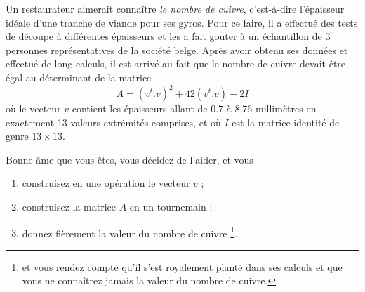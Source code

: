 \begin{exercice}\label{exoMatlab0028}

Un restaurateur aimerait connaître \emph{le nombre de cuivre}, c'est-à-dire l'épaisseur idéale d'une tranche de viande pour ses gyros. Pour ce faire, il a effectué des tests de découpe à différentes épaisseurs et les a fait gouter à un échantillon de 3 personnes représentatives de la société belge.
Après avoir obtenu ses données et effectué de long calculs, il est arrivé au fait que le nombre de cuivre devait être égal au déterminant de la matrice
\[ A= (v^t.v)^2 + 42(v^t.v) - 2I \]
où le vecteur $v$ contient les épaisseurs allant de $0.7$ à $8.76$ millimètres en exactement 13 valeurs extrémités comprises, et où
$I$ est la matrice identité de genre $13\times 13$.

Bonne âme que vous êtes, vous décidez de l'aider, et vous
\begin{enumerate}
\item construisez en une opération le vecteur $v$ ;
\item construisez la matrice $A$ en un tournemain ;
\item donnez fièrement la valeur du nombre de cuivre \footnote{et vous rendez compte qu'il s'est royalement planté dans ses calculs et que vous ne connaîtrez jamais la valeur du nombre de cuivre.}.
\end{enumerate}

\end{exercice}
